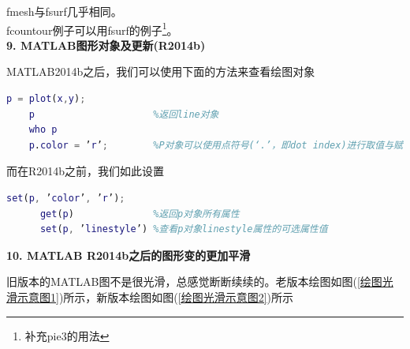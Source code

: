     fmesh与fsurf几乎相同。\\
    fcountour例子可以用fsurf的例子\footnote{补充pie3的用法}。\\
    \textbf{9. MATLAB图形对象及更新(R2014b)}
    \par
    MATLAB2014b之后，我们可以使用下面的方法来查看绘图对象
    \begin{lstlisting}[language=Matlab]
    p = plot(x,y);
    p                     %返回line对象
    who p
    p.color = ’r’;        %P对象可以使用点符号(‘.’，即dot index)进行取值与赋值
    \end{lstlisting}
    而在R2014b之前，我们如此设置
    \begin{lstlisting}[language=Matlab]
      set(p, ’color’, ’r’);
      get(p)              %返回p对象所有属性
      set(p, ’linestyle’) %查看p对象linestyle属性的可选属性值
    \end{lstlisting}
    \textbf{10. MATLAB R2014b之后的图形变的更加平滑}
    \par
    旧版本的MATLAB图不是很光滑，总感觉断断续续的。老版本绘图如图(\ref{绘图光滑示意图1})所示，新版本绘图如图(\ref{绘图光滑示意图2})所示
